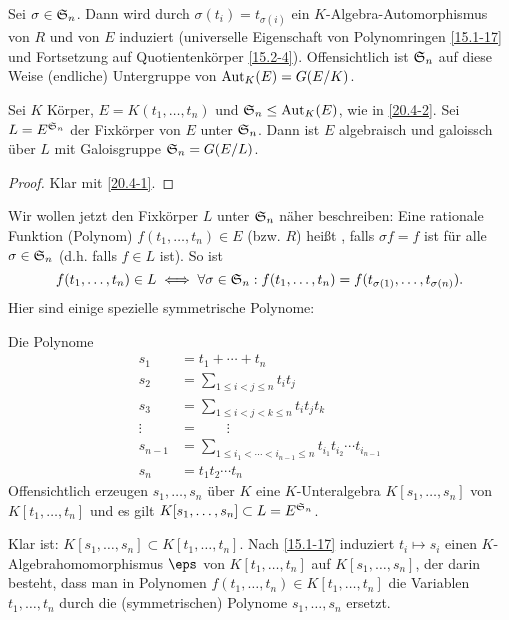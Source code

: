 \begin{df} \label{20.4-2}
	Sei $\sigma \in \S_n$.
	Dann wird durch $\sigma(t_i) = t_{\sigma(i)}$ ein $K$-Algebra-Automorphismus von $R$ und von $E$ induziert (universelle Eigenschaft von Polynomringen \ref{15.1-17} und Fortsetzung auf Quotientenkörper \ref{15.2-4}).
	Offensichtlich ist $\S_n$ auf diese Weise (endliche) Untergruppe von $\Aut_K(E) = G(E / K)$.
\end{df}

\begin{st} \label{20.4-3}
	Sei $K$ Körper, $E = K(t_1, \dotsc, t_n)$ und $\S_n \le \Aut_K(E)$, wie in \ref{20.4-2}.
	Sei $L = E^{\S_n}$ der Fixkörper von $E$ unter $\S_n$.
	Dann ist $E$ algebraisch und galoissch über $L$ mit Galoisgruppe $\S_n = G(E / L)$.
	\begin{proof}
		Klar mit \ref{20.4-1}.
	\end{proof}
\end{st}

Wir wollen jetzt den Fixkörper $L$ unter $\S_n$ näher beschreiben:
Eine rationale Funktion (Polynom) $f(t_1, \dotsc, t_n) \in E$ (bzw. $R$) heißt , falls $\sigma f = f$ ist für alle $\sigma \in \S_n$ (d.h. falls $f \in L$ ist).
So ist
\[
	f(t_1, \dotsc, t_n) \in L
	\iff
	\forall \sigma \in \S_n : f(t_1, \dotsc, t_n) = f(t_{\sigma(1)}, \dotsc, t_{\sigma(n)}).
\]
Hier sind einige spezielle symmetrische Polynome:

\begin{ex} \label{20.4-4}
	Die  Polynome
	\begin{align*}
		s_1 &= t_1 + \dotsb + t_n \\
		s_2 &= \sum_{1 \le i < j \le n} t_i t_j  \\
		s_3 &= \sum_{1 \le i < j < k \le n} t_i t_j t_k \\
		\vdots\; &= \qquad \vdots \\
		s_{n-1} &= \sum_{1 \le i_1 < \dotsb < i_{n-1} \le n} t_{i_1} t_{i_2} \dotsb t_{i_{n-1}} \\
		s_n &= t_1 t_2 \dotsb t_n
	\end{align*}
	Offensichtlich erzeugen $s_1, \dotsc, s_n$ über $K$ eine $K$-Unteralgebra $K[s_1, \dotsc, s_n]$ von $K[t_1, \dotsc, t_n]$ und es gilt $K[s_1, \dotsc, s_n] \subset L = E^{\S_n}$.
\end{ex}

Klar ist: $K[s_1, \dotsc, s_n] \subset K[t_1, \dotsc, t_n]$.
Nach \ref{15.1-17} induziert $t_i \mapsto s_i$ einen $K$-Algebrahomomorphismus $\eps$ von $K[t_1, \dotsc, t_n]$ auf $K[s_1, \dotsc, s_n]$, der darin besteht, dass man in Polynomen $f(t_1, \dotsc, t_n) \in K[t_1, \dotsc, t_n]$ die Variablen $t_1, \dotsc, t_n$ durch die (symmetrischen) Polynome $s_1, \dotsc, s_n$ ersetzt.

